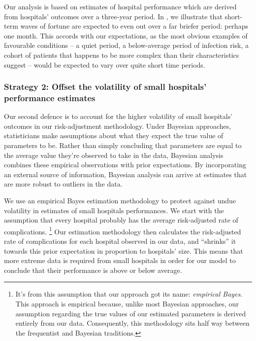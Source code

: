 \documentclass[submission]{grattan}
\begin{document}
Our analysis is based on estimates of hospital performance which are derived from hospitals' outcomes over a three-year period.
In , we illustrate that short-term waves of fortune are expected to even out over a far briefer period: perhaps one month.
This accords with our expectations, as the most obvious examples of favourable conditions -- a quiet period, a below-average period of infection risk, a cohort of patients that happens to be more complex than their characteristics suggest -- would be expected to vary over quite short time periods.

\subsubsection{Strategy 2: Offset the volatility of small hospitals' performance estimates}\label{subsubsec:strategy-2-offset-the-volatility-of-small-hospitals-performance-estimates}

Our second defence is to account for the higher volatility of small hospitals' outcomes in our risk-adjustment methodology.
Under Bayesian approaches, statisticians make assumptions about what they expect the true value of parameters to be.
Rather than simply concluding that parameters are equal to the average value they're observed to take in the data, Bayesian analysis combines these empirical observations with prior expectations.
By incorporating an external source of information, Bayesian analysis can arrive at estimates that are more robust to outliers in the data.

We use an empirical Bayes estimation methodology to protect against undue volatility in estimates of small hospitals performances.
We start with the assumption that every hospital probably has the average risk-adjusted rate of complications.%
	\footnote{It's from this assumption that our approach got its name: \emph{empirical Bayes}.
	This approach is empirical because, unlike most Bayesian approaches, our assumption regarding the true values of our estimated parameters is derived entirely from our data.
	Consequently, this methodology sits half way between the frequentist and Bayesian traditions.}
Our estimation methodology then calculates the risk-adjusted rate of complications for each hospital observed in our data, and ``shrinks'' it towards this prior expectation in proportion to hospitals' size.
This means that more extreme data is required from small hospitals in order for our model to conclude that their performance is above or below average.
\end{document}
